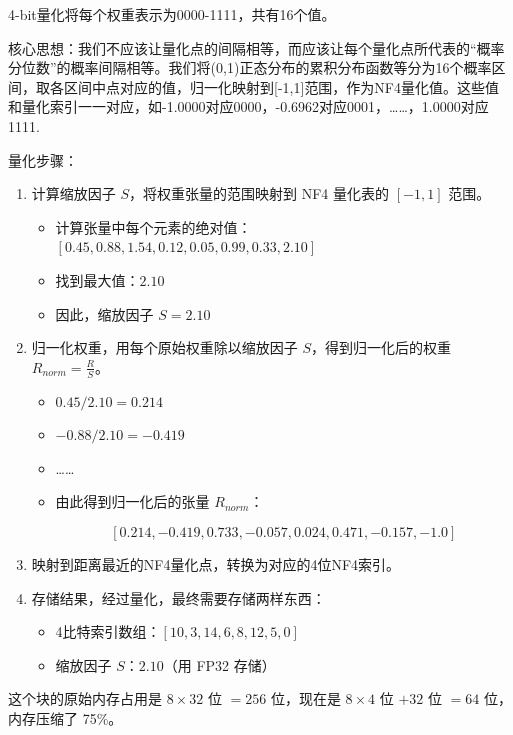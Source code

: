 4-bit量化将每个权重表示为0000-1111，共有16个值。

核心思想：我们不应该让量化点的间隔相等，而应该让每个量化点所代表的``概率分位数''的概率间隔相等。我们将(0,1)正态分布的累积分布函数等分为16个概率区间，取各区间中点对应的值，归一化映射到{[}-1,1{]}范围，作为NF4量化值。这些值和量化索引一一对应，如-1.0000对应0000，-0.6962对应0001，\ldots\ldots，1.0000对应1111.

量化步骤：

\begin{enumerate}
\def\labelenumi{\arabic{enumi}.}
\item
  计算缩放因子 \(S\)，将权重张量的范围映射到 NF4 量化表的 \([-1, 1]\) 范围。

  \begin{itemize}
  \tightlist
  \item
    计算张量中每个元素的绝对值：\([0.45, 0.88, 1.54, 0.12, 0.05, 0.99, 0.33, 2.10]\)
  \item
    找到最大值：\(2.10\)
  \item
    因此，缩放因子 \(S = 2.10\)
  \end{itemize}
\item
  归一化权重，用每个原始权重除以缩放因子 \(S\)，得到归一化后的权重 \(R_{norm} = \frac{R}{S}\)。

  \begin{itemize}
  \tightlist
  \item
    \(0.45 / 2.10 = 0.214\)
  \item
    \(-0.88 / 2.10 = -0.419\)
  \item
    \ldots\ldots{}
  \item
    由此得到归一化后的张量 \(R_{norm}\)：

\[
[0.214, -0.419, 0.733, -0.057, 0.024, 0.471, -0.157, -1.0]
\]
  \end{itemize}
\item
  映射到距离最近的NF4量化点，转换为对应的4位NF4索引。
\item
  存储结果，经过量化，最终需要存储两样东西：

  \begin{itemize}
  \tightlist
  \item
    4比特索引数组：\([10, 3, 14, 6, 8, 12, 5, 0]\)
  \item
    缩放因子 \(S\)：\(2.10\)（用 FP32 存储）
  \end{itemize}
\end{enumerate}

这个块的原始内存占用是 \(8 \times 32\) 位 \(= 256\) 位，现在是 \(8 \times 4\) 位 \(+ 32\) 位 \(= 64\) 位，内存压缩了 75\%。

